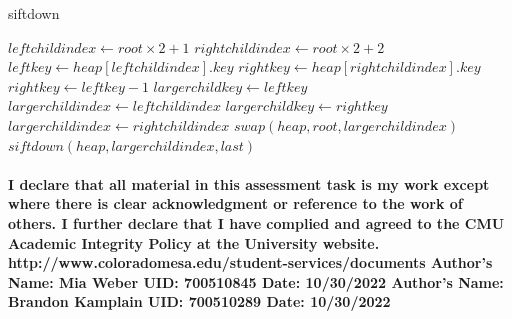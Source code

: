 \documentclass{article}
\begin{document}
\begin{algorithm}
\caption{siftdown}\label{alg:cap}
\begin{algorithmic}
\State $leftchildindex \gets root \times 2+1$
\State $rightchildindex \gets root \times 2+2$
\State $leftkey \gets heap[leftchildindex].key$
\State $rightkey \gets heap[rightchildindex].key$
\Else
\State $rightkey \gets leftkey-1$
\EndIf
{}
\State $largerchildkey \gets leftkey$
\State $largerchildindex \gets leftchildindex$
\Else
\State $largerchildkey \gets rightkey$
\State $largerchildindex \gets rightchildindex$
\EndIf
{}
\State $swap(heap, root, largerchildindex)$
\State $siftdown(heap, largerchildindex, last)$
\EndIf
\EndIf
\end{algorithmic}
\end{algorithm}

\paragraph{\linebreak I declare that all material in this assessment task is my work except where there is clear acknowledgment or reference to the work of others. I further declare that I have complied and agreed to the CMU Academic Integrity Policy at the University website.
\linebreak  http://www.coloradomesa.edu/student-services/documents
\linebreak \linebreak Author’s Name: Mia Weber UID: 700510845 Date: 10/30/2022
\linebreak Author's Name: Brandon Kamplain UID: 700510289 Date: 10/30/2022}
\end{document}

